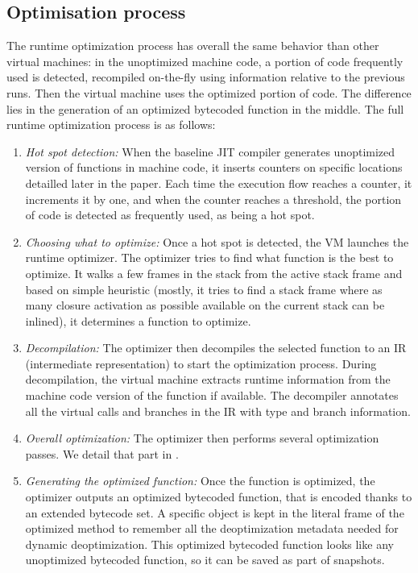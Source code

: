 \documentclass[a4paper,12pt,twoside]{../includes/ThesisStyle}
\begin{document}

\subsection {Optimisation process}

The runtime optimization process has overall the same behavior than other virtual machines: in the unoptimized machine code, a portion of code frequently used is detected, recompiled on-the-fly using information relative to the previous runs. Then the virtual machine uses the optimized portion of code. The difference lies in the generation of an optimized bytecoded function in the middle. The full runtime optimization process is as follows:
\begin{enumerate}
\item \emph{Hot spot detection:} When the baseline JIT compiler  generates unoptimized version of functions in machine code, it  inserts counters on specific locations detailled later in the paper. Each time the execution flow reaches a counter, it increments it by one, and when the counter reaches a threshold, the portion of code is detected as frequently used, \ie as being a hot spot.
\item \emph{Choosing what to optimize:} Once a hot spot is detected, the VM launches the runtime optimizer. The optimizer tries to find what function is the best to optimize. It walks a few frames in the stack from the active stack frame and based on simple heuristic (mostly, it tries to find a stack frame where as many closure activation as possible available on the current stack can be inlined), it determines a function to optimize.
\item \emph{Decompilation:} The optimizer then decompiles the selected function to an IR (intermediate representation) to start the optimization process. During decompilation, the virtual machine extracts runtime information from the machine code version of the function if available. The decompiler annotates all the virtual calls and branches in the IR with type and branch information.
\item \emph{Overall optimization:} The optimizer then performs several optimization passes.  We detail that part in .
\item \emph{Generating the optimized function:} Once the function is optimized, the optimizer outputs an optimized bytecoded function, that is encoded thanks to an extended bytecode set. A specific object is kept in the literal frame of the optimized method to remember all the deoptimization metadata needed for dynamic deoptimization. This optimized bytecoded function looks like any unoptimized bytecoded function, so it can be saved as part of snapshots.

\end{enumerate}
\end{document}
